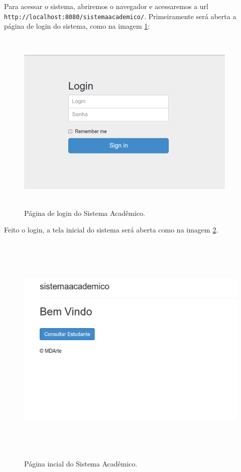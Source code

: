Para acessar o sistema, abriremos o navegador e acessaremos a url
\texttt{http://localhost:8080/sistemaacademico/}. Primeiramente será aberta a
página de login do sistema, como na imagem \ref{pagina_login}:
\begin{figure}[H]
	\centering
	\includegraphics[width=300pt,height=250pt]{imgs/tutorial-mdarte-0013.png}
	\caption{Página de login do Sistema Acadêmico.}
	\label{pagina_login}
\end{figure}

Feito o login, a tela inicial do sistema será aberta como na imagem
\ref{pagina_inicial}.
\begin{figure}[H]
	\centering
	\includegraphics[width=400pt,height=320pt]{imgs/tutorial-mdarte-0017.png}
	\caption{Página incial do Sistema Acadêmico.}
	\label{pagina_inicial}
\end{figure}

